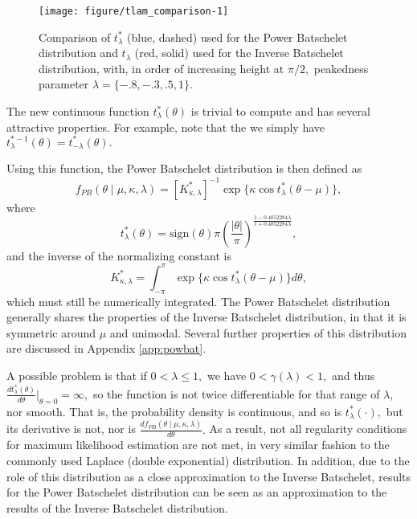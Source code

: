 \begin{figure}
\begin{center}
\begin{knitrout}
\color{fgcolor}
\texttt{[image: figure/tlam\_comparison-1]} 

\end{knitrout}
\end{center}
\caption{Comparison of  \(t_\lambda^\ast\) (blue, dashed) used for the Power Batschelet distribution and \(t_\lambda\) (red, solid) used for the Inverse Batschelet distribution, with, in order of increasing height at \(\pi/2,\) peakedness parameter \(\lambda = \{-.8, -.3, .5, 1\}.\)}
\label{fig:tlamcompare}
\end{figure}

The new continuous function \( t_{\lambda}^\ast(\theta) \) is trivial to compute and has several attractive properties. For example, note that the we simply have \(t_{\lambda}^{\ast-1}(\theta)= t_{-\lambda}^\ast(\theta).\)

Using this function, the Power Batschelet distribution is then defined as
\begin{equation} \label{eqn:powbatpdf}
 f_{PB}(\theta \mid \mu, \kappa, \lambda) = [K^\ast_{\kappa, \lambda}]^{-1} \exp\{\kappa \cos t^\ast_\lambda(\theta - \mu)\},
\end{equation}
where
\begin{equation}
  t_{\lambda}^\ast(\theta) = \text{sign}(\theta)\pi \left( \frac{\vert\theta\vert}{\pi} \right)^{ \frac{1 - 0.4052284\lambda}{1 + 0.4052284\lambda}},
\end{equation}
and the inverse of the normalizing constant is
\begin{equation}
   K^\ast_{\kappa, \lambda} = \int_{-\pi}^\pi \exp\{\kappa \cos t^\ast_\lambda(\theta - \mu)\} d\theta,
\end{equation}
which must still be numerically integrated. The Power Batschelet distribution generally shares the properties of the Inverse Batschelet distribution, in that it is symmetric around \(\mu\) and unimodal. Several further properties of this distribution are discussed in Appendix \ref{app:powbat}.

A possible problem is that if \(0 < \lambda \leq 1,\) we have \(0 < \gamma(\lambda) < 1,\) and thus \(\frac{d t^\ast_{\lambda}(\theta)}{d\theta}\Bigr|_{\theta = 0} = \infty,\) so the function is not twice differentiable for that range of \(\lambda\), nor smooth. That is, the probability density is continuous, and so is $t^\ast_\lambda(\cdot),$ but its derivative is not, nor is \( \frac{d f_{PB}(\theta \mid \mu, \kappa, \lambda)}{d\theta}.\) As a result, not all regularity conditions for maximum likelihood estimation are not met, in very similar fashion to the commonly used Laplace (double exponential) distribution. In addition, due to the role of this distribution as a close approximation to the Inverse Batschelet, results for the Power Batschelet distribution can be seen as an approximation to the results of the Inverse Batschelet distribution.


